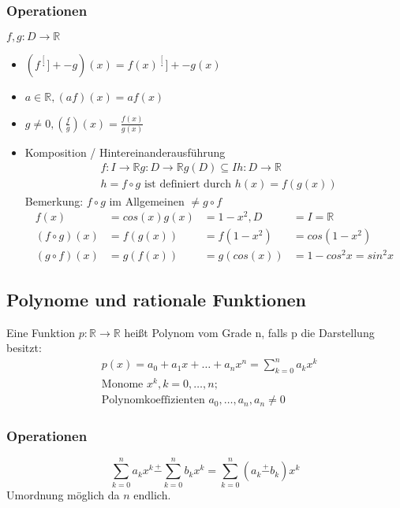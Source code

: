 \subsubsection{Operationen}
\( f,g: D \rightarrow \mathbb{R} \)
\begin{itemize}
	\item \((f \stackrel[\cdot]{+}{-} g)(x) = f(x)  \stackrel[\cdot]{+}{-} g(x) \)
	\item \(a \in \mathbb{R}, (af)(x)=af(x)\)
	\item \(g \neq 0, (\frac{f}{g})(x)=\frac{f(x)}{g(x)}\)
	\item 	Komposition / Hintereinanderausführung\newline
	\begin{align*} &f:I\rightarrow\mathbb{R}  g:D\rightarrow\mathbb{R} g(D) \subseteq I h:D\rightarrow\mathbb{R} \\ &h = f \circ g  \text{ ist definiert durch } h(x) = f( g(x) )
	\end{align*}
	Bemerkung: \(f \circ g \) im Allgemeinen \( \neq g \circ f \)
	\begin{align*}
		f(x) &= cos(x) g(x) &= 1-x^2, D &= I=\mathbb{R} \\
		(f \circ g)(x) &= f(g(x)) &= f(1-x^2) &= cos(1-x^2) \\
		(g \circ f)(x) &= g(f(x)) &= g(cos(x)) &= 1-cos^2x = sin^2x 
	\end{align*}	
\end{itemize}

\subsection{Polynome und rationale Funktionen} %
\label{sub:polyFunk}

Eine Funktion \( p:\mathbb{R} \rightarrow \mathbb{R} \) heißt Polynom vom Grade n, falls p die Darstellung besitzt:
\begin{align*}
	&p(x)=a_0+a_1x+\ldots+a_n x^n = \sum_{k=0}^{n} a_kx^k\\
	&\text{Monome }x^k, k=0,\ldots,n; \\
	&\text{Polynomkoeffizienten }a_0,\ldots,a_n,a_n \neq 0
\end{align*}

\subsubsection{Operationen} %
\label{ssub:polyOp}

\[
	\sum_{k=0}^{n}a_kx^k \stackrel{+}{-} 	\sum_{k=0}^{n}b_kx^k = \sum_{k=0}^{n}(a_k \stackrel{+}{-} b_k)x^k
\]
Umordnung möglich da \( n \) endlich.

